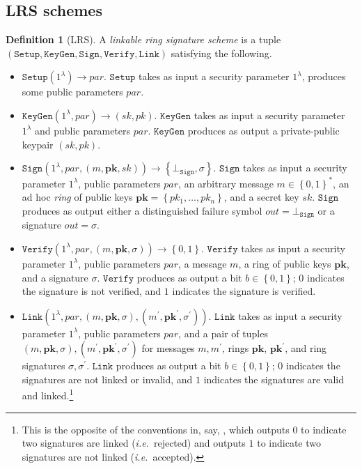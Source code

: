 \documentclass{mrl}
\theoremstyle{plain}
\theoremstyle{definition}
\newtheorem{definition}{Definition}[section]
\begin{document}
\subsection{LRS schemes}
\begin{definition}[LRS]\label{def:lrs}
A \textit{linkable ring signature scheme} is a tuple $\left(\texttt{Setup}, \texttt{KeyGen}, \right. \allowbreak \left. \texttt{Sign}, \texttt{Verify}, \texttt{Link}\right)$ satisfying the following. 
\begin{itemize}
\item $\texttt{Setup}(1^\lambda) \to \textit{par}$. $\texttt{Setup}$ takes as input a security parameter $1^\lambda$, produces some public parameters $\textit{par}$. 

\item $\texttt{KeyGen}(1^\lambda, \textit{par}) \to (sk, pk)$. $\texttt{KeyGen}$ takes as input a security parameter $1^\lambda$ and public parameters $\textit{par}$. $\texttt{KeyGen}$ produces as output a private-public keypair $(sk, pk)$. 

\item $\texttt{Sign}\left(1^\lambda, \textit{par}, (m, \textbf{pk}, sk)\right) \to \left\{\bot_{\texttt{Sign}}, \sigma \right\}$. $\texttt{Sign}$ takes as input a security parameter $1^\lambda$, public parameters $\textit{par}$, an arbitrary message $m \in \left\{0,1\right\}^*$, an ad hoc \textit{ring} of public keys $\textbf{pk} = \left\{pk_1, \ldots, pk_n\right\}$, and a secret key $sk$. $\texttt{Sign}$ produces as output either a distinguished failure symbol $\textit{out} = \bot_{\texttt{Sign}}$ or a signature $\textit{out} = \sigma$.

\item $\texttt{Verify}\left(1^\lambda, \textit{par}, (m, \textbf{pk}, \sigma)\right) \to \left\{0,1\right\}$. $\texttt{Verify}$ takes as input a security parameter $1^\lambda$, public parameters $\textit{par}$, a message $m$, a ring of public keys $\textbf{pk}$, and a signature $\sigma$. $\texttt{Verify}$ produces as output a bit $b \in \left\{0,1\right\}$; $0$ indicates the signature is not verified, and $1$ indicates the signature is verified.

\item $\texttt{Link}\left(1^\lambda, \textit{par}, (m, \textbf{pk}, \sigma), (m^\prime, \textbf{pk}^\prime, \sigma^\prime)\right)$. $\texttt{Link}$ takes as input a security parameter $1^\lambda$, public parameters $\textit{par}$, and a pair of tuples $(m, \textbf{pk}, \sigma), (m^\prime, \textbf{pk}^\prime, \sigma^\prime)$ for messages $m, m^\prime$, rings $\textbf{pk}$, $\textbf{pk}^\prime$, and ring signatures $\sigma, \sigma^\prime$. $\texttt{Link}$ produces as output a bit $b \in \left\{0,1\right\}$; $0$ indicates the signatures are not linked or invalid, and $1$ indicates the signatures are valid and linked.\footnote{This is the opposite of the conventions in, say, \cite{tsang2004separable}, which outputs $0$ to indicate two signatures are linked (\textit{i.e.}\ rejected) and outputs $1$ to indicate two signatures are not linked (\textit{i.e.}\ accepted).} 
\end{itemize}
\end{definition}
\end{document}
